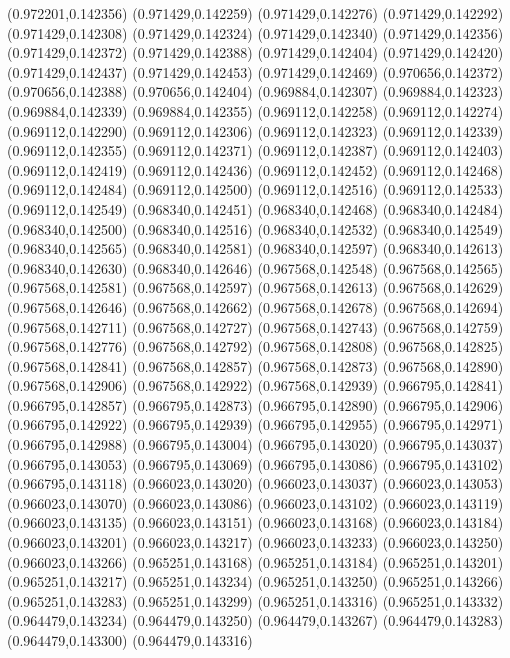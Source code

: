(0.972201,0.142356)
(0.971429,0.142259)
(0.971429,0.142276)
(0.971429,0.142292)
(0.971429,0.142308)
(0.971429,0.142324)
(0.971429,0.142340)
(0.971429,0.142356)
(0.971429,0.142372)
(0.971429,0.142388)
(0.971429,0.142404)
(0.971429,0.142420)
(0.971429,0.142437)
(0.971429,0.142453)
(0.971429,0.142469)
(0.970656,0.142372)
(0.970656,0.142388)
(0.970656,0.142404)
(0.969884,0.142307)
(0.969884,0.142323)
(0.969884,0.142339)
(0.969884,0.142355)
(0.969112,0.142258)
(0.969112,0.142274)
(0.969112,0.142290)
(0.969112,0.142306)
(0.969112,0.142323)
(0.969112,0.142339)
(0.969112,0.142355)
(0.969112,0.142371)
(0.969112,0.142387)
(0.969112,0.142403)
(0.969112,0.142419)
(0.969112,0.142436)
(0.969112,0.142452)
(0.969112,0.142468)
(0.969112,0.142484)
(0.969112,0.142500)
(0.969112,0.142516)
(0.969112,0.142533)
(0.969112,0.142549)
(0.968340,0.142451)
(0.968340,0.142468)
(0.968340,0.142484)
(0.968340,0.142500)
(0.968340,0.142516)
(0.968340,0.142532)
(0.968340,0.142549)
(0.968340,0.142565)
(0.968340,0.142581)
(0.968340,0.142597)
(0.968340,0.142613)
(0.968340,0.142630)
(0.968340,0.142646)
(0.967568,0.142548)
(0.967568,0.142565)
(0.967568,0.142581)
(0.967568,0.142597)
(0.967568,0.142613)
(0.967568,0.142629)
(0.967568,0.142646)
(0.967568,0.142662)
(0.967568,0.142678)
(0.967568,0.142694)
(0.967568,0.142711)
(0.967568,0.142727)
(0.967568,0.142743)
(0.967568,0.142759)
(0.967568,0.142776)
(0.967568,0.142792)
(0.967568,0.142808)
(0.967568,0.142825)
(0.967568,0.142841)
(0.967568,0.142857)
(0.967568,0.142873)
(0.967568,0.142890)
(0.967568,0.142906)
(0.967568,0.142922)
(0.967568,0.142939)
(0.966795,0.142841)
(0.966795,0.142857)
(0.966795,0.142873)
(0.966795,0.142890)
(0.966795,0.142906)
(0.966795,0.142922)
(0.966795,0.142939)
(0.966795,0.142955)
(0.966795,0.142971)
(0.966795,0.142988)
(0.966795,0.143004)
(0.966795,0.143020)
(0.966795,0.143037)
(0.966795,0.143053)
(0.966795,0.143069)
(0.966795,0.143086)
(0.966795,0.143102)
(0.966795,0.143118)
(0.966023,0.143020)
(0.966023,0.143037)
(0.966023,0.143053)
(0.966023,0.143070)
(0.966023,0.143086)
(0.966023,0.143102)
(0.966023,0.143119)
(0.966023,0.143135)
(0.966023,0.143151)
(0.966023,0.143168)
(0.966023,0.143184)
(0.966023,0.143201)
(0.966023,0.143217)
(0.966023,0.143233)
(0.966023,0.143250)
(0.966023,0.143266)
(0.965251,0.143168)
(0.965251,0.143184)
(0.965251,0.143201)
(0.965251,0.143217)
(0.965251,0.143234)
(0.965251,0.143250)
(0.965251,0.143266)
(0.965251,0.143283)
(0.965251,0.143299)
(0.965251,0.143316)
(0.965251,0.143332)
(0.964479,0.143234)
(0.964479,0.143250)
(0.964479,0.143267)
(0.964479,0.143283)
(0.964479,0.143300)
(0.964479,0.143316)
